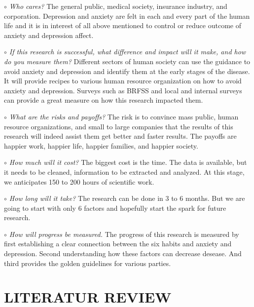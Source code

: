 \documentclass[letterpaper, 10 pt, conference]{ieeeconf}  %
\begin{document}
\par\noindent\textit{$\circ$ Who cares?}\newline
\textnormal{
The general public, medical society, insurance industry, and corporation. Depression 
and anxiety are felt in each and every part of the human life and it is in interest 
of all above mentioned to control or reduce outcome of anxiety and depression affect.
}
\par\noindent\textit{$\circ$ If this research is successful, what difference and impact will it make, and how do you measure them?}\newline
\textnormal{
Different sectors of 
human society can use the guidance to avoid anxiety and depression and identify them at the early 
stages of the disease. It will provide recipes to various human resource organization 
on how to avoid anxiety and depression. Surveys such as BRFSS and local and internal 
surveys can provide a great measure on how this research impacted them.
}
\par\noindent\textit{$\circ$ What are the risks and payoffs?}\newline
\textnormal{
The risk is to convince mass public, human resource organizations, and small 
to large companies that the results of this research will indeed assist them 
get better and faster results. The payoffs are happier work, happier life, 
happier families, and happier society.  
}
\par\noindent\textit{$\circ$ How much will it cost?}\newline
\textnormal{
The biggest cost is the time. The data is available, but it 
needs to be cleaned, information to be extracted and analyzed. 
At this stage, we anticipates 150 to 200 hours of scientific work. 
}
\par\noindent\textit{$\circ$ How long will it take?}\newline
\textnormal{
The research can be done in 3 to 6 months. But we are going to start
with only 6 factors and hopefully start the spark for future research. 
}
\par\noindent\textit{$\circ$ How will progress be measured.}\newline
\textnormal{
The progress of this research is measured by first establishing a clear connection 
between the six habits and anxiety and depression. Second understanding how these 
factors can decrease desease. And third provides the golden 
guidelines for various parties.
}

\setlength{\parskip}{.5em} %
\section{LITERATUR REVIEW}
\end{document}
